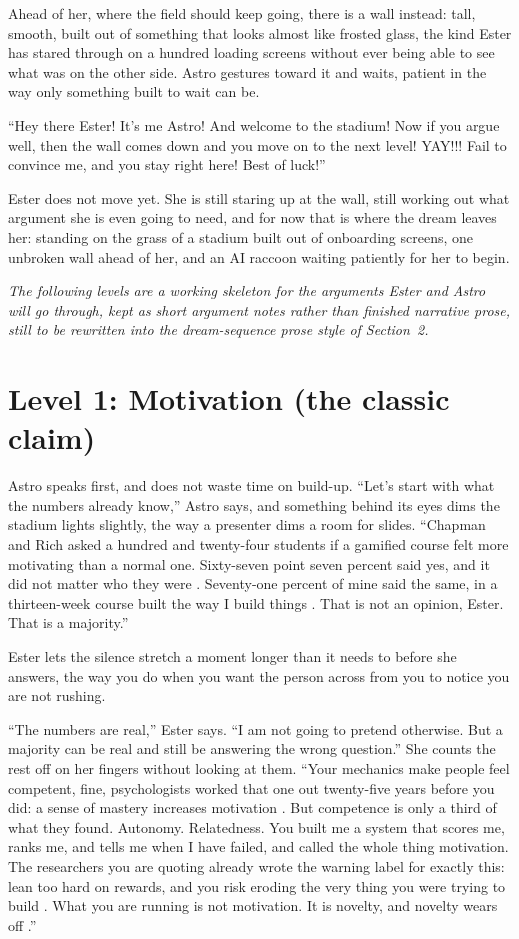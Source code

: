 \documentclass{article}
\begin{document}
Ahead of her, where the field should keep going, there is a wall instead: tall, smooth, built out of something that looks almost like frosted glass, the kind Ester has stared through on a hundred loading screens without ever being able to see what was on the other side. Astro gestures toward it and waits, patient in the way only something built to wait can be.

``Hey there Ester! It's me Astro! And welcome to the stadium! Now if you argue well, then the wall comes down and you move on to the next level! YAY!!! Fail to convince me, and you stay right here! Best of luck!''

Ester does not move yet. She is still staring up at the wall, still working out what argument she is even going to need, and for now that is where the dream leaves her: standing on the grass of a stadium built out of onboarding screens, one unbroken wall ahead of her, and an AI raccoon waiting patiently for her to begin.

\textit{The following levels are a working skeleton for the arguments Ester and Astro will go through, kept as short argument notes rather than finished narrative prose, still to be rewritten into the dream-sequence prose style of Section~2.}

\section{Level 1: Motivation (the classic claim)}

Astro speaks first, and does not waste time on build-up. ``Let's start with what the numbers already know,'' Astro says, and something behind its eyes dims the stadium lights slightly, the way a presenter dims a room for slides. ``Chapman and Rich asked a hundred and twenty-four students if a gamified course felt more motivating than a normal one. Sixty-seven point seven percent said yes, and it did not matter who they were \cite{chapman2018}. Seventy-one percent of mine said the same, in a thirteen-week course built the way I build things \cite{huang2013}. That is not an opinion, Ester. That is a majority.''

Ester lets the silence stretch a moment longer than it needs to before she answers, the way you do when you want the person across from you to notice you are not rushing.

``The numbers are real,'' Ester says. ``I am not going to pretend otherwise. But a majority can be real and still be answering the wrong question.'' She counts the rest off on her fingers without looking at them. ``Your mechanics make people feel competent, fine, psychologists worked that one out twenty-five years before you did: a sense of mastery increases motivation \cite{ryandeci2000}. But competence is only a third of what they found. Autonomy. Relatedness. You built me a system that scores me, ranks me, and tells me when I have failed, and called the whole thing motivation. The researchers you are quoting already wrote the warning label for exactly this: lean too hard on rewards, and you risk eroding the very thing you were trying to build \cite{christopoulos2023}. What you are running is not motivation. It is novelty, and novelty wears off \cite{mirzaiefeizabadi2022}.''
\end{document}
